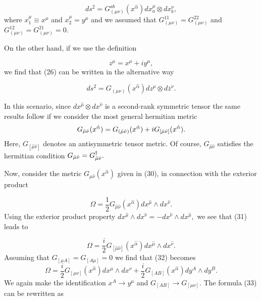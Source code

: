 \documentclass[a4paper,12pt]{article}
\begin{document}
\begin{equation}
ds^{2}=G_{(\mu \nu )}^{ab}(x^{\hat{\alpha}})dx_{a}^{\mu }\otimes dx_{b}^{\nu
},  \label{27}
\end{equation}
where $x_{1}^{\mu }\equiv x^{\mu }$ and $x_{2}^{\mu }=y^{\mu }$ and we
assumed that $G_{(\mu \nu )}^{11}=G_{(\mu \nu )}^{22}$ and $G_{(\mu \nu
)}^{12}=G_{(\mu \nu )}^{21}=0.$

On the other hand, if we use the definition

\begin{equation}
z^{\mu }=x^{\mu }+iy^{\mu },  \label{28}
\end{equation}
we find that (26) can be written in the alternative way

\begin{equation}
ds^{2}=G_{(\mu \nu )}(x^{\hat{\alpha}})dz^{\mu }\otimes d\bar{z}^{\nu }.
\label{29}
\end{equation}

In this scenario, since $dx^{\hat{\mu}}\otimes dx^{\hat{\nu}}$ is a
second-rank symmetric tensor the same results follow if we consider the most
general hermitian metric 
\begin{equation}
G_{\hat{\mu}\hat{\nu}}(x^{\hat{\alpha}})=G_{(\hat{\mu}\hat{\nu})}(x^{\hat{%
\alpha}})+iG_{[\hat{\mu}\hat{\nu}]}(x^{\hat{\alpha}}).  \label{30}
\end{equation}
Here, $G_{[\hat{\mu}\hat{\nu}]}$ denotes an antisymmetric tensor metric. Of
course, $G_{\hat{\mu}\hat{\nu}}$ satisfies the hermitian condition $G_{\hat{%
\mu}\hat{\nu}}=G_{\hat{\mu}\hat{\nu}}^{\dagger }.$

Now, consider the metric $G_{\hat{\mu}\hat{\nu}}(x^{\hat{\alpha}})$ given in
(30), in connection with the exterior product

\begin{equation}
\Omega =\frac{1}{2}G_{\hat{\mu}\hat{\nu}}(x^{\hat{\alpha}})dx^{\hat{\mu}%
}\wedge dx^{\hat{\nu}}.  \label{31}
\end{equation}
Using the exterior product property $dx^{\hat{\mu}}\wedge dx^{\hat{\nu}%
}=-dx^{\hat{\nu}}\wedge dx^{\hat{\mu}},$ we see that (31) leads to

\begin{equation}
\Omega =\frac{i}{2}G_{[\hat{\mu}\hat{\nu}]}(x^{\hat{\alpha}})dx^{\hat{\mu}%
}\wedge dx^{\hat{\nu}}.  \label{32}
\end{equation}
Assuming that $G_{[\mu A]}=G_{[A\mu ]}=0$ we find that (32) becomes 
\begin{equation}
\Omega =\frac{i}{2}G_{[\mu \nu ]}(x^{\hat{\alpha}})dx^{\mu }\wedge dx^{\nu }+%
\frac{i}{2}G_{[AB]}(x^{\hat{\alpha}})dy^{A}\wedge dy^{B}.  \label{33}
\end{equation}
We again make the identification $x^{A}\rightarrow y^{\mu }$ and $%
G_{[AB]}\rightarrow G_{[\mu \nu ]}.$ The formula (33) can be rewritten as
\end{document}
